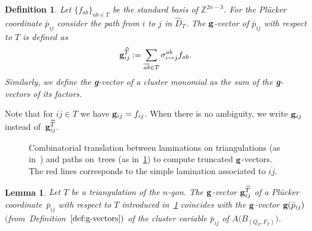 \documentclass[10pt,a4paper]{amsart}
\newcommand{\thlabel}[1]{\label{#1}}
\newcommand{\thref}[1]{\ref{#1}}
\newtheorem{Lemma}[Theorem]{Lemma}
\newtheorem{Definition}[Theorem]{Definition}
\numberwithin{equation}{section}
\begin{document}
\begin{Definition}\thlabel{def:g}
Let $\{f_{{ab}}\}_{\overline{ab}\in T}$ be the standard basis of $\mathbb{Z}^{2n-3}$.
For the Pl\"ucker coordinate $\bar p_{ij}$ consider the path from $i$ to $j$ in $\widehat D_T$. The ${\bf g}$-{\it vector} of $\bar p_{ij}$ with respect to $T$ is defined as
\begin{displaymath}
{\bf g}^{\widehat T}_{ij}:=\sum_{\overline{ab}\in T} \sigma_{i\rightsquigarrow j}^{ab}f_{ab}.
\end{displaymath}
Similarly, we define the {\bf g}-vector of a cluster monomial as the sum of the {\bf g}-vectors of its factors.
\end{Definition}
Note that for $\overline{ij}\in T$ we have ${\bf g}_{ij}=f_{ij}$.
When there is no ambiguity, we write ${\bf g}_{ij}$ instead of~${\bf g}^{\widehat T}_{ij}$.
\begin{figure}[ht]
 \centering
{}
 \caption{Combinatorial translation between laminations on triangulations (as in~\cite{fomin2018cluster}) and paths on~trees (as in~\thref{def:g}) to compute truncated ${\bf g}$-vectors. The red lines corresponds to the simple lamination associated to $\overline{ij} $.}
 \label{fig:gv dictionary}
\end{figure}
\begin{Lemma}\thlabel{lem:g are gv}
Let $T$ be a triangulation of the $n$-gon. The ${\bf g}$-vector ${\bf g}^{\widehat T}_{ij}$ of a Pl\"ucker coordinate~$\overline{p}_{ij}$ with respect to $T$ introduced in~\thref{def:g} coincides with the ${\bf g}$-vector ${\bf g}(\bar p_{ij})$ $($from~Defi\-ni\-tion~$\ref{def:g-vectors})$ of the cluster variable $\bar p_{ij} $ of $ A\big(B_{(Q_T,F_T)}\big)$.
\end{Lemma}
\end{document}
